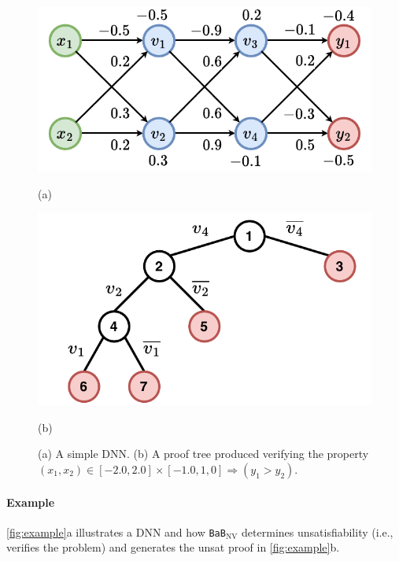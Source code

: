 \documentclass[oneside,11pt,dvipsnames]{book}
\newcommand{\dd}{\texttt{BaB$_{\text{NV}}$}}
\newcommand{\neuralsat}{\texttt{NeuralSAT}}
\begin{document}
\begin{figure}[t]
    \begin{minipage}[b]{\linewidth}
        \centering
        \begin{minipage}[t]{0.48\textwidth}
            \centering  
            \includegraphics[width=\linewidth]{figure/proof_net.pdf}
            \caption*{(a)}
        \end{minipage}
        \begin{minipage}[t]{0.48\textwidth}
            \centering
            \includegraphics[width=\linewidth]{figure/proof_tree.pdf}
            \caption*{(b)}
        \end{minipage}
        \caption{(a) A simple DNN.  (b) A proof tree produced verifying the property $(x_1, x_2) \in [-2.0, 2.0] \times [-1.0, 1,0] \Rightarrow (y_1 > y_2)$.}
        \label{fig:example}
    \end{minipage}
\end{figure}

\paragraph{Example} \autoref{fig:example}a illustrates a DNN and how \dd{} determines unsatisfiability (i.e., verifies the problem) and generates the unsat proof in \autoref{fig:example}b.
\end{document}
